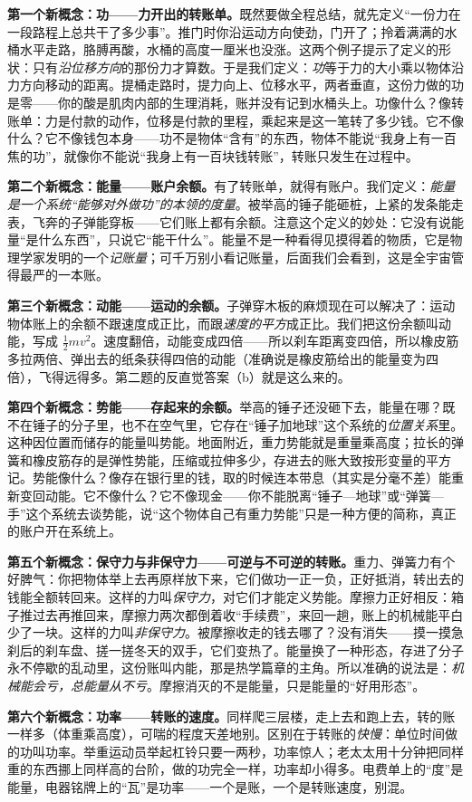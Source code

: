 \begin{mainline}
\textbf{第一个新概念：功——力开出的转账单。}既然要做全程总结，就先定义“一份力在一段路程上总共干了多少事”。推门时你沿运动方向使劲，门开了；拎着满满的水桶水平走路，胳膊再酸，水桶的高度一厘米也没涨。这两个例子提示了定义的形状：只有\emph{沿位移方向}的那份力才算数。于是我们定义：\emph{功}等于力的大小乘以物体沿力方向移动的距离。提桶走路时，提力向上、位移水平，两者垂直，这份力做的功是零——你的酸是肌肉内部的生理消耗，账并没有记到水桶头上。功像什么？像转账单：力是付款的动作，位移是付款的里程，乘起来是这一笔转了多少钱。它不像什么？它不像钱包本身——功不是物体“含有”的东西，物体不能说“我身上有一百焦的功”，就像你不能说“我身上有一百块钱转账”，转账只发生在过程中。

\textbf{第二个新概念：能量——账户余额。}有了转账单，就得有账户。我们定义：\emph{能量是一个系统“能够对外做功”的本领的度量}。被举高的锤子能砸桩，上紧的发条能走表，飞奔的子弹能穿板——它们账上都有余额。注意这个定义的妙处：它没有说能量“是什么东西”，只说它“能干什么”。能量不是一种看得见摸得着的物质，它是物理学家发明的一个\emph{记账量}；可千万别小看记账量，后面我们会看到，这是全宇宙管得最严的一本账。

\textbf{第三个新概念：动能——运动的余额。}子弹穿木板的麻烦现在可以解决了：运动物体账上的余额不跟速度成正比，而跟\emph{速度的平方}成正比。我们把这份余额叫动能，写成 \(\frac{1}{2}mv^2\)。速度翻倍，动能变成四倍——所以刹车距离变四倍，所以橡皮筋多拉两倍、弹出去的纸条获得四倍的动能（准确说是橡皮筋给出的能量变为四倍），飞得远得多。第二题的反直觉答案（b）就是这么来的。

\textbf{第四个新概念：势能——存起来的余额。}举高的锤子还没砸下去，能量在哪？既不在锤子的分子里，也不在空气里，它存在“锤子加地球”这个系统的\emph{位置关系}里。这种因位置而储存的能量叫势能。地面附近，重力势能就是重量乘高度；拉长的弹簧和橡皮筋存的是弹性势能，压缩或拉伸多少，存进去的账大致按形变量的平方记。势能像什么？像存在银行里的钱，取的时候连本带息（其实是分毫不差）能重新变回动能。它不像什么？它不像现金——你不能脱离“锤子—地球”或“弹簧—手”这个系统去谈势能，说“这个物体自己有重力势能”只是一种方便的简称，真正的账户开在系统上。

\textbf{第五个新概念：保守力与非保守力——可逆与不可逆的转账。}重力、弹簧力有个好脾气：你把物体举上去再原样放下来，它们做功一正一负，正好抵消，转出去的钱能全额转回来。这样的力叫\emph{保守力}，对它们才能定义势能。摩擦力正好相反：箱子推过去再推回来，摩擦力两次都倒着收“手续费”，来回一趟，账上的机械能平白少了一块。这样的力叫\emph{非保守力}。被摩擦收走的钱去哪了？没有消失——摸一摸急刹后的刹车盘、搓一搓冬天的双手，它们变热了。能量换了一种形态，存进了分子永不停歇的乱动里，这份账叫内能，那是热学篇章的主角。所以准确的说法是：\emph{机械能会亏，总能量从不亏}。摩擦消灭的不是能量，只是能量的“好用形态”。

\textbf{第六个新概念：功率——转账的速度。}同样爬三层楼，走上去和跑上去，转的账一样多（体重乘高度），可喘的程度天差地别。区别在于转账的\emph{快慢}：单位时间做的功叫功率。举重运动员举起杠铃只要一两秒，功率惊人；老太太用十分钟把同样重的东西挪上同样高的台阶，做的功完全一样，功率却小得多。电费单上的“度”是能量，电器铭牌上的“瓦”是功率——一个是账，一个是转账速度，别混。
\end{mainline}

